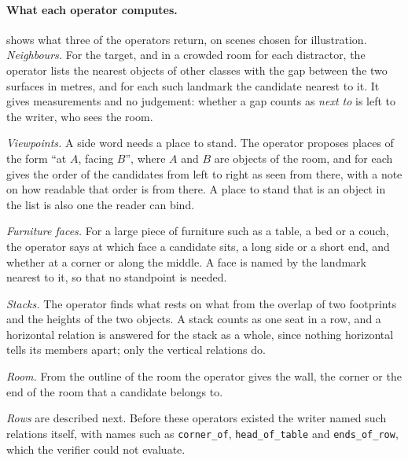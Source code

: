 \paragraph{What each operator computes.}
 shows what three of the operators return, on scenes chosen for illustration.
\emph{Neighbours.}
For the target, and in a crowded room for each distractor, the operator lists the nearest objects of other classes with the gap between the two surfaces in metres, and for each such landmark the candidate nearest to it.
It gives measurements and no judgement: whether a gap counts as \emph{next to} is left to the writer, who sees the room.

\emph{Viewpoints.}
A side word needs a place to stand.
The operator proposes places of the form ``at $A$, facing $B$'', where $A$ and $B$ are objects of the room, and for each gives the order of the candidates from left to right as seen from there, with a note on how readable that order is from there.
A place to stand that is an object in the list is also one the reader can bind.

\emph{Furniture faces.}
For a large piece of furniture such as a table, a bed or a couch, the operator says at which face a candidate sits, a long side or a short end, and whether at a corner or along the middle.
A face is named by the landmark nearest to it, so that no standpoint is needed.

\emph{Stacks.}
The operator finds what rests on what from the overlap of two footprints and the heights of the two objects.
A stack counts as one seat in a row, and a horizontal relation is answered for the stack as a whole, since nothing horizontal tells its members apart; only the vertical relations do.

\emph{Room.}
From the outline of the room the operator gives the wall, the corner or the end of the room that a candidate belongs to.

\emph{Rows} are described next.
Before these operators existed the writer named such relations itself, with names such as \texttt{corner\_of}, \texttt{head\_of\_table} and \texttt{ends\_of\_row}, which the verifier could not evaluate.

